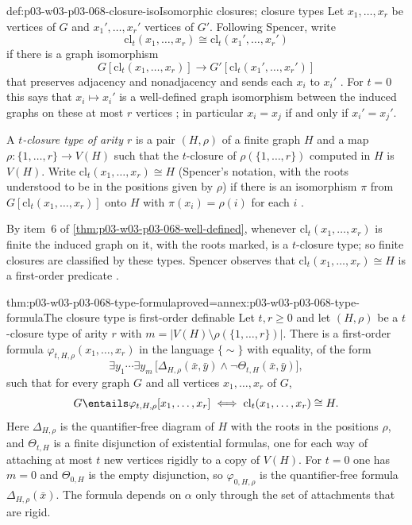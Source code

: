 \begin{hbdefinition}{def:p03-w03-p03-068-closure-iso}{Isomorphic closures; closure types}
Let \(x_1,\ldots,x_r\) be vertices of \(G\) and \(x_1',\ldots,x_r'\)
vertices of \(G'\).  Following Spencer, write
\[
 \mathrm{cl}_t(x_1,\ldots,x_r)\cong\mathrm{cl}_t(x_1',\ldots,x_r')
\]
if there is a graph isomorphism
\[
 G[\mathrm{cl}_t(x_1,\ldots,x_r)]\longrightarrow
 G'[\mathrm{cl}_t(x_1',\ldots,x_r')]
\]
that preserves adjacency and nonadjacency and sends each \(x_i\) to \(x_i'\) \cite[pp.~8--9]{Spencer2007LogicRandomStructuresAuthor}.
For \(t=0\) this says that \(x_i\mapsto x_i'\) is a well-defined graph
isomorphism between the induced graphs on these at most \(r\) vertices
\cite[p.~9]{Spencer2007LogicRandomStructuresAuthor}; in particular \(x_i=x_j\) if and only
if \(x_i'=x_j'\).

A \emph{\(t\)-closure type of arity \(r\)} is a pair \((H,\rho)\) of a finite
graph \(H\) and a map \(\rho\colon\{1,\ldots,r\}\to V(H)\) such that the
\(t\)-closure of \(\rho(\{1,\ldots,r\})\) computed in \(H\) is \(V(H)\).
Write \(\mathrm{cl}_t(x_1,\ldots,x_r)\cong H\) (Spencer's notation, with the
roots understood to be in the positions given by \(\rho\)) if there is an
isomorphism \(\pi\) from \(G[\mathrm{cl}_t(x_1,\ldots,x_r)]\) onto \(H\) with
\(\pi(x_i)=\rho(i)\) for each \(i\) \cite[p.~9]{Spencer2007LogicRandomStructuresAuthor}.
\end{hbdefinition}

By item~6 of \cref{thm:p03-w03-p03-068-well-defined}, whenever
\(\mathrm{cl}_t(x_1,\ldots,x_r)\) is finite the induced graph on it, with the
roots marked, is a \(t\)-closure type; so finite closures are classified by
these types.  Spencer observes that \(\mathrm{cl}_t(x_1,\ldots,x_r)\cong H\) is
a first-order predicate \cite[p.~9]{Spencer2007LogicRandomStructuresAuthor}.

\begin{hbtheorem}{thm:p03-w03-p03-068-type-formula}{proved=annex:p03-w03-p03-068-type-formula}{The closure type is first-order definable}
Let \(t,r\geq0\) and let \((H,\rho)\) be a \(t\)-closure type of arity
\(r\) with \(m=|V(H)\setminus\rho(\{1,\ldots,r\})|\).  There is a
first-order formula \(\varphi_{t,H,\rho}(x_1,\ldots,x_r)\) in the language
\(\{\sim\}\) with equality, of the form
\[
  \exists y_1\cdots\exists y_m\,\bigl[\Delta_{H,\rho}(\bar x,\bar y)\wedge
  \neg\Theta_{t,H}(\bar x,\bar y)\bigr],
\]
such that for every graph \(G\) and all vertices \(x_1,\ldots,x_r\) of \(G\),
\[
  G\entails\varphi_{t,H,\rho}[x_1,\ldots,x_r]
  \iff\mathrm{cl}_t(x_1,\ldots,x_r)\cong H .
\]
Here \(\Delta_{H,\rho}\) is the quantifier-free diagram of \(H\) with the
roots in the positions \(\rho\), and \(\Theta_{t,H}\) is a finite disjunction
of existential formulas, one for each way of attaching at most \(t\) new
vertices rigidly to a copy of \(V(H)\).  For \(t=0\) one has \(m=0\) and
\(\Theta_{0,H}\) is the empty disjunction, so \(\varphi_{0,H,\rho}\) is the
quantifier-free formula \(\Delta_{H,\rho}(\bar x)\).  The formula depends on
\(\alpha\) only through the set of attachments that are rigid.
\end{hbtheorem}

